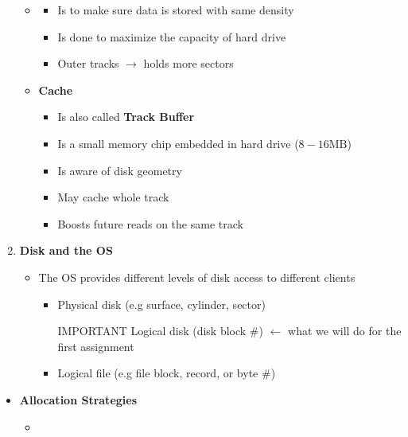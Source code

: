 \documentclass[12pt]{article}
\begin{document}
\begin{enumerate}[1.]
\begin{itemize}
        \item \begin{itemize}
            \item Is to make sure data is stored with same density
            \item Is done to maximize the capacity of hard drive
            \item Outer tracks $\to$ holds more sectors
        \end{itemize}
        \item \textbf{Cache}
        \begin{itemize}
            \item Is also called \textbf{Track Buffer}
            \item Is a small memory chip embedded in hard drive ($8 - 16 \text{MB}$)
            \item Is aware of disk geometry
            \item May cache whole track
            \item Boosts future reads on the same track
        \end{itemize}
    \end{itemize}
    \item \textbf{Disk and the OS}
    \begin{itemize}
        \item The OS provides different levels of disk access to different clients
        \begin{itemize}
            \item Physical disk (e.g surface, cylinder, sector)
            \item [\color{red}IMPORTANT\color{black}] Logical disk (disk block \#) \color{red}$\leftarrow$ what we will do for the first assignment\color{black}
            \item Logical file (e.g file block, record, or byte \#)
        \end{itemize}
    \end{itemize}
\end{enumerate}

\bigskip

\begin{itemize}
    \item \textbf{Allocation Strategies}
    \begin{itemize}
        \item
    \end{itemize}
\end{itemize}
\end{document}
